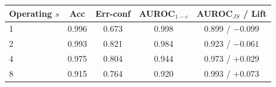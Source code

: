 \begin{tabular}{lcccc}
\toprule
Operating $s$ & Acc & Err-conf & AUROC$_{1-c}$ & AUROC$_{JS}$ / Lift \\
\midrule
1 & 0.996 & 0.673 & 0.998 & 0.899 / $-0.099$ \\
2 & 0.993 & 0.821 & 0.984 & 0.923 / $-0.061$ \\
4 & 0.975 & 0.804 & 0.944 & 0.973 / $+0.029$ \\
8 & 0.915 & 0.764 & 0.920 & 0.993 / $+0.073$ \\
\bottomrule
\end{tabular}
